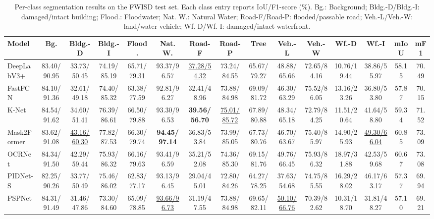 \documentclass[lettersize,journal]{IEEEtran}
\begin{document}
\begin{table}[!t]
\caption{Per-class segmentation results on the FWISD test set. Each class entry reports IoU/F1-score (\%). Bg.: Background; Bldg.-D/Bldg.-I: damaged/intact building; Flood.: Floodwater; Nat. W.: Natural Water; Road-F/Road-P: flooded/passable road; Veh.-L/Veh.-W: land/water vehicle; Wf.-D/Wf.-I: damaged/intact waterfront.}
\label{tab:fwisd-per-class-results}
\centering
\scriptsize
\setlength{\tabcolsep}{0.8pt}
\renewcommand{\arraystretch}{1.12}
\begin{tabular}{lcccccccccccccc}
\hline
Model & Bg. & Bldg.-D & Bldg.-I & Flood. & Nat. W. & Road-F & Road-P & Tree & Veh.-L & Veh.-W & Wf.-D & Wf.-I & mIoU & mF1 \\
\hline
DeepLabV3+\cite{chenRethinkingAtrousConvolution2017} &83.40/90.95 & 33.73/50.45 & 74.19/85.19 & 65.71/79.31 & 93.37/96.57 & \underline{37.28/54.32} & 73.24/84.55 & 65.67/79.27 & 48.88/65.66 & 72.65/84.16 & 10.76/19.44 & 38.86/55.97 & 58.15 & 70.49 \\
FastFCN\cite{wu2019fastfcn} &84.10/91.36 & 32.61/49.18 & 74.40/85.32 & 63.38/77.59 & 92.81/96.27 & 32.41/48.96 & 73.88/84.98 & 69.09/81.72 & 46.30/63.29 & 75.52/86.05 & 13.16/23.26 & 36.80/53.80 & 57.87 & 70.15 \\
K-Net\cite{zhang2021knet} &84.54/91.62 & 34.60/51.41 & 76.39/86.61 & 66.50/79.88 & 93.30/96.53 & \textbf{39.56/56.70} & \underline{75.01/85.72} & 67.89/80.88 & 48.34/65.18 & 72.79/84.25 & 11.51/20.64 & 41.64/58.80 & 59.34 & 71.52 \\
Mask2Former\cite{NEURIPS2021_950a4152} &83.62/91.08 & \underline{43.16/60.30} & 77.82/87.53 & 66.30/79.74 & \textbf{94.45/97.14} & 36.83/53.84 & 73.99/85.05 & 67.73/80.76 & 46.70/63.67 & 75.40/85.97 & 14.90/25.93 & \underline{49.30/66.04} & 60.85 & 73.09 \\
OCRNet\cite{YuanCW20} &84.34/91.50 & 42.29/59.44 & 75.93/86.32 & 66.16/79.63 & 93.41/96.59 & 35.21/52.08 & 74.36/85.30 & 69.15/81.76 & 49.76/66.45 & 75.93/86.32 & 18.97/31.88 & 42.53/59.68 & 60.67 & 73.08 \\
PIDNet-S\cite{xu2022pidnet} &82.25/90.26 & 33.77/50.49 & 75.46/86.02 & 62.83/77.17 & 93.13/96.45 & 29.04/45.01 & 72.80/84.26 & 64.27/78.25 & 37.63/54.68 & 74.75/85.55 & 16.29/28.02 & 46.17/63.17 & 57.37 & 69.94 \\
PSPNet\cite{zhaoPyramidSceneParsing2017a} &84.31/91.49 & 31.46/47.86 & 73.30/84.60 & 65.09/78.85 & \underline{93.66/96.73} & 31.19/47.55 & 73.88/84.98 & 69.65/82.11 & \underline{50.10/66.76} & 70.39/82.62 & 10.31/18.70 & 31.81/48.27 & 57.10 & 69.21 \\

\end{tabular}
\end{table}
\end{document}
